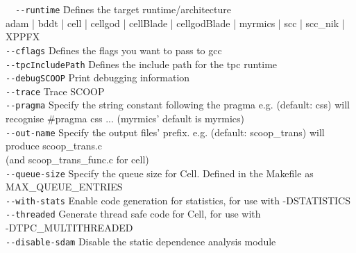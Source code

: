 \documentclass[a4paper]{article}
\begin{document}
  \begin{tabbing}
  \ \ \=\verb!--runtime!\hspace{9em} \=
  Defines the target runtime/architecture\\
                                    \>\>adam | bddt | cell | cellgod | cellBlade | cellgodBlade | myrmics | scc | scc\_nik | XPPFX\\[1ex]
  \>\verb!--cflags!                   \>Defines the flags you want to pass to gcc\\[1ex]
  \>\verb!--tpcIncludePath!           \>Defines the include path for the tpc runtime\\[1ex]
  \>\verb!--debugSCOOP!               \>Print debugging information\\[1ex]
  \>\verb!--trace!                    \>Trace SCOOP\\[1ex]
  \>\verb!--pragma!                   \>Specify the string constant following the pragma e.g. (default: css) will recognise \#pragma css ... (myrmics' default is myrmics)\\[1ex]
  \>\verb!--out-name!                 \>Specify the output files' prefix. e.g. (default: scoop\_trans) will produce scoop\_trans.c\\
                                    \>\>(and scoop\_trans\_func.c for cell)\\[1ex]
  \>\verb!--queue-size!               \>Specify the queue size for Cell. Defined in the Makefile as\\
                                    \>\>MAX\_QUEUE\_ENTRIES\\[1ex]
  \>\verb!--with-stats!               \>Enable code generation for statistics, for use with -DSTATISTICS\\[1ex]
  \>\verb!--threaded!                 \>Generate thread safe code for Cell, for use with\\
                                    \>\>-DTPC\_MULTITHREADED\\[1ex]
  \>\verb!--disable-sdam!             \>Disable the static dependence analysis module
  \end{tabbing}
\end{document}

